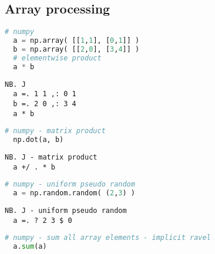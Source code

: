 \subsection*{Array processing}

\begin{tcolorbox}[breakable, size=fbox, boxrule=1pt, pad at break*=1mm,colback=cellbackground, colframe=cellborder]
\begin{lstlisting}[language=python, frame=single, framerule=0pt, basicstyle=\ttfamily\normalsize, keywordstyle=\bfseries\color{keywcolor}\normalsize]
  # numpy 
  a = np.array( [[1,1], [0,1]] ) 
  b = np.array( [[2,0], [3,4]] ) 
  # elementwise product 
  a * b
\end{lstlisting}

\begin{lstlisting}[language=jdoc, frame=single, framerule=0pt, basicstyle=\ttfamily\normalsize, keywordstyle=\bfseries\color{keywcolor}\normalsize] 
  NB. J 
  a =. 1 1 ,: 0 1 
  b =. 2 0 ,: 3 4 
  a * b
\end{lstlisting}

\begin{lstlisting}[language=python, frame=single, framerule=0pt, basicstyle=\ttfamily\normalsize, keywordstyle=\bfseries\color{keywcolor}\normalsize]
  # numpy - matrix product 
  np.dot(a, b)
\end{lstlisting}

\begin{lstlisting}[language=jdoc, frame=single, framerule=0pt, basicstyle=\ttfamily\normalsize, keywordstyle=\bfseries\color{keywcolor}\normalsize] 
  NB. J - matrix product 
  a +/ . * b   
\end{lstlisting} 
  
\begin{lstlisting}[language=python, frame=single, framerule=0pt, basicstyle=\ttfamily\normalsize, keywordstyle=\bfseries\color{keywcolor}\normalsize]
  # numpy - uniform pseudo random 
  a = np.random.random( (2,3) )  
\end{lstlisting}

\begin{lstlisting}[language=jdoc, frame=single, framerule=0pt, basicstyle=\ttfamily\normalsize, keywordstyle=\bfseries\color{keywcolor}\normalsize]   
  NB. J - uniform pseudo random 
  a =. ? 2 3 $ 0  
\end{lstlisting}
  
\begin{lstlisting}[language=python, frame=single, framerule=0pt, basicstyle=\ttfamily\normalsize, keywordstyle=\bfseries\color{keywcolor}\normalsize]
  # numpy - sum all array elements - implicit ravel 
  a.sum(a)  
\end{lstlisting}


\end{tcolorbox}
